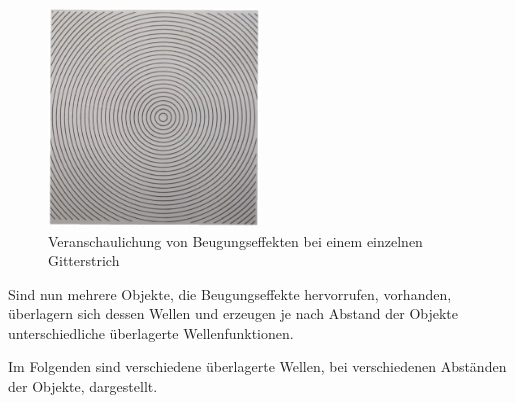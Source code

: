 \documentclass[11pt,ngerman]{scrartcl}
\begin{document}
\begin{figure}[H]
	\begin{center}
		\includegraphics[width=0.5\textwidth]{./pics/beugungsphaenomen.pdf}
	\end{center}
	\caption{Veranschaulichung von Beugungseffekten bei einem einzelnen Gitterstrich \cite{SchweizerAbbe}}
	\label{fig:beugungseffekt}
\end{figure}

\noindent Sind nun mehrere Objekte, die Beugungseffekte hervorrufen, vorhanden, überlagern sich dessen
Wellen und erzeugen je nach Abstand der Objekte unterschiedliche überlagerte Wellenfunktionen.

\vspace{2mm}

\noindent Im Folgenden sind verschiedene überlagerte Wellen, bei verschiedenen Abständen der
Objekte, dargestellt.

\vspace{2mm}
\end{document}
